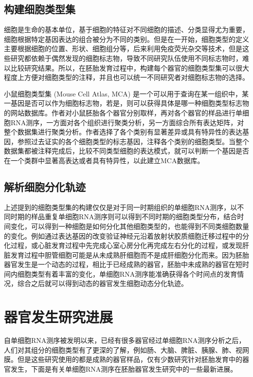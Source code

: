 \documentclass[lang=cn]{elegantpaper}
\begin{document}
\subsection{构建细胞类型集}
细胞是生命的基本单位，基于细胞的特征对不同细胞的描述、分类显得尤为重要，细胞根据特定基因表达的组合被分为不同的类别。但是在一开始，细胞类型的定义主要根据细胞的位置、形状、细胞组分等，后来利用免疫荧光杂交等技术，但是这些研究都依赖于偶然发现的细胞标志物，导致不同研究队伍使用不同标志物时，难以比较研究结果\citep{regev_human_2017}。所以，在胚胎发育过程中，构建每个器官的细胞类型集可以很大程度上方便对细胞类型的注释，并且也可以统一不同研究者对细胞标志物的选择。

小鼠细胞类型集 (Mouse Cell Atlas, MCA) 是一个可以用于查询在某一组织中，某一基因是否可以作为细胞标志物，若是，则可以获得具体是哪一种细胞类型标志物的网站数据库\citep{han_mapping_2018}。作者对小鼠胚胎各个器官分别取样，再对各个器官的样品进行单细胞RNA测序，一方面对各个组织进行聚类分析，另一方面综合所有表达矩阵，对整个数据集进行聚类分析。作者选择了各个类别有显著差异或具有特异性的表达基因，参照过去证实的各个细胞类型的标志基因，注释各个类别的细胞类型。当整个数据集都被注释完成后，比较不同类型细胞的表达模式，就可以判断一个基因是否在一个类群中显著高表达或者具有特异性，以此建立MCA数据库。

\subsection{解析细胞分化轨迹}
上述提到的细胞类型集的构建仅仅是对于同一时期组织的单细胞RNA测序，以不同时期的样品重复单细胞RNA测序则可以得到不同时期的细胞类型分布，结合时间变化，可以得到一种细胞是如何分化其他细胞类型的，也能得到不同类细胞数量的变化。例如通过表达基因的改变验证神经元沿着放射状胶质细胞迁移过程中的分化过程\citep{zhong_single-cell_2018}，或心脏发育过程中先完成心室心房分化再完成左右分化的过程\citep{cui_single-cell_2019}，或发现肝脏发育过程中胆管细胞可能是从未成熟肝细胞而不是成肝细胞分化而来\citep{su_single-cell_2017}。因为胚胎器官发生是一个动态的过程，相比于已经成熟的器官，胚胎中未成熟的器官在短时间内细胞类型有着丰富的变化，单细胞RNA测序能准确获得各个时间点的发育情况，综合之后就可以得到动态的器官发生细胞动态分化轨迹。

\section{器官发生研究进展}
自单细胞RNA测序被发明以来，已经有很多器官经过单细胞RNA测序分析之后，人们对其组分的细胞类型有了更深的了解，例如肠\citep{grun_single-cell_2015,haber_single-cell_2017}、大脑\citep{zeisel_cell_2015}、脾脏\citep{jaitin_massively_2014}、胰腺\citep{baron_single-cell_2016,muraro_single-cell_2016}、肺\citep{treutlein_reconstructing_2014}、视网膜\citep{macosko_highly_2015}。但是这些研究使用的都是成熟的器官样品，仅有少数研究针对胚胎发育中的器官发生，下面是有关单细胞RNA测序在胚胎器官发生研究中的一些最新进展。
\end{document}
